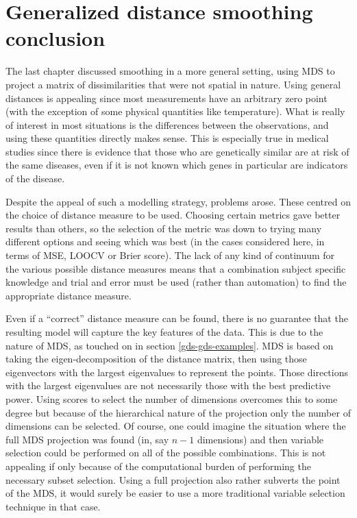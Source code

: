 \section{Generalized distance smoothing conclusion}
\label{fasend-gds-conc}

The last chapter discussed smoothing in a more general setting, using MDS to project a matrix of dissimilarities that were not spatial in nature. Using general distances is appealing since most measurements have an arbitrary zero point (with the exception of some physical quantities like temperature). What is really of interest in most situations is the differences between the observations, and using these quantities directly makes sense. This is especially true in medical studies since there is evidence that those who are genetically similar are at risk of the same diseases, even if it is not known which genes in particular are indicators of the disease.

Despite the appeal of such a modelling strategy, problems arose. These centred on the choice of distance measure to be used. Choosing certain metrics gave better results than others, so the selection of the metric was down to trying many different options and seeing which was best (in the cases considered here, in terms of MSE, LOOCV or Brier score). The lack of any kind of continuum for the various possible distance measures means that a combination subject specific knowledge and trial and error must be used (rather than automation) to find the appropriate distance measure.

Even if a ``correct'' distance measure can be found, there is no guarantee that the resulting model will capture the key features of the data. This is due to the nature of MDS, as touched \label{cor-6s3}on in section \ref{gds-gds-examples}. MDS is based on taking the eigen-decomposition of the distance matrix, then using those eigenvectors with the largest eigenvalues to represent the points. Those directions with the largest eigenvalues are not necessarily those with the best predictive power. Using scores to select the number of dimensions overcomes this to some degree but because of the hierarchical nature of the projection only the number of dimensions can be selected. Of course, one could imagine the situation where the full MDS projection was found (in, say $n-1$ dimensions) and then variable selection could be performed on all of the possible combinations. This is not appealing if only because \label{cor-6s4}of the computational burden of performing the necessary subset selection. Using a full projection also rather subverts the point of the MDS, it would surely be easier to use a more traditional variable selection technique in that case.

